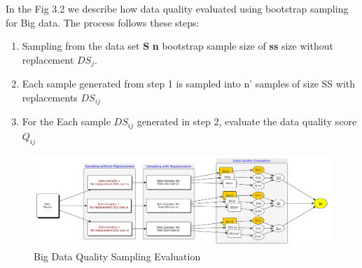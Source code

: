 In the Fig 3.2 we describe how data quality evaluated using bootstrap sampling for Big data. The process
follows these steps: 

\begin{enumerate}
	\item {Sampling from the data set \textbf{S} \textbf{n} bootstrap sample size of \textbf{ss} size without replacement \textbf{$DS_j$}. }
	\item {Each sample generated from step 1 is sampled into n' samples of size SS with replacements $DS_{ij}$}
	\item {For the Each sample \textbf{$DS_{ij}$} generated in step 2, evaluate the data quality score $Q_{ij}$}	
\end{enumerate}


\begin{figure}[h]
	\vspace*{-.1in}
	\hspace*{-.6in}
	\centering
	\includegraphics[scale=.38]{big-data-quality-sampling-evaluation}
	\caption{Big Data Quality Sampling Evaluation}    
\end{figure}

